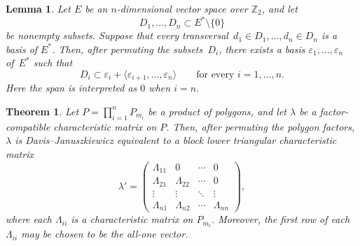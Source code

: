 \documentclass[10pt,a4paper]{amsart}
\newtheorem{lemma}{Lemma}
\newtheorem{theorem}{Theorem}
\newcommand{\Z}{\mathbb Z}
\begin{document}
\begin{lemma} \label{lem:colored triangularization}
    Let $E$ be an $n$-dimensional vector space over $\Z_2$, and let
    $$
        D_1,\ldots,D_n\subset E^\ast\setminus\{0\}
    $$
    be nonempty subsets.
    Suppose that every transversal~$d_1\in D_1,\ldots,d_n\in D_n$ is a basis of $E^\ast$.
    Then, after permuting the subsets~$D_i$, there exists a basis $\varepsilon_1,\ldots,\varepsilon_n$ of~$E^\ast$ such that
    $$
        D_i\subset \varepsilon_i+ \langle \varepsilon_{i+1},\ldots,\varepsilon_n\rangle \qquad \text{for every } i=1,\ldots,n.
    $$
    Here the span is interpreted as $0$ when $i=n$.
\end{lemma}

\begin{theorem}\label{thm:blockize}
    Let $P=\prod_{i=1}^n P_{m_i}$ be a product of polygons, and let $\lambda$ be a factor-compatible characteristic matrix on $P$.
    Then, after permuting the polygon factors, $\lambda$ is Davis--Januszkiewicz equivalent to a block lower triangular characteristic matrix
    $$
        \lambda'=
        \begin{pmatrix}
        \Lambda_{11} & 0            & \cdots & 0\\
        \Lambda_{21} & \Lambda_{22} & \cdots & 0\\
        \vdots       & \vdots       & \ddots & \vdots\\
        \Lambda_{n1} & \Lambda_{n2} & \cdots & \Lambda_{nn}
        \end{pmatrix},
    $$
    where each $\Lambda_{ii}$ is a characteristic matrix on $P_{m_i}$.
    Moreover, the first row of each $\Lambda_{ii}$ may be chosen to be the all-one vector.
\end{theorem}
\end{document}

